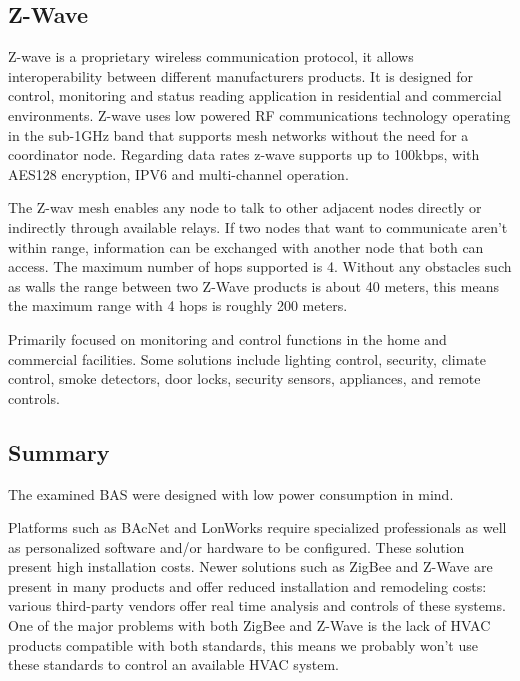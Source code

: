 %


\subsection{Z-Wave}\label{zwave_sub}


Z-wave \cite{zwave}\cite{zigbeeAndZWave} is a proprietary wireless communication protocol, it allows interoperability between different manufacturers products. It is designed for control, monitoring and status reading application in residential and commercial environments.
Z-wave uses low powered RF communications technology operating in the sub-1GHz band that supports mesh networks without the need for a coordinator node.
Regarding data rates z-wave supports up to 100kbps, with AES128 encryption, IPV6 and multi-channel operation.

The Z-wav mesh enables any node to talk to other adjacent nodes directly or indirectly through available relays. If two nodes that want to communicate aren't within range, information can be exchanged with another node that both can access. The maximum number of hops supported is 4. Without any obstacles such as walls the range between two Z-Wave products is about 40 meters, this means the maximum range with 4 hops is roughly 200 meters.  


Primarily focused on monitoring and control functions in the home and  commercial facilities. Some solutions include lighting control, security, climate control, smoke detectors, door locks, security sensors, appliances, and remote controls.

\subsection{Summary}

The examined BAS were designed with low power consumption in mind. 

Platforms such as BAcNet and LonWorks require specialized professionals as well as personalized software and/or hardware to be configured. These solution present high installation costs. Newer solutions such as ZigBee and Z-Wave are present in many products and offer reduced installation and remodeling costs: various third-party vendors offer real time analysis and controls of these systems. One of the major problems with both ZigBee and Z-Wave is the lack of \ac{HVAC} products compatible with both standards, this means we probably won't use these standards to control an available \ac{HVAC} system.




